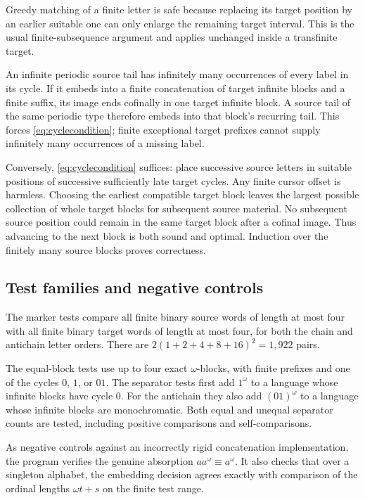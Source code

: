 \documentclass[11pt,letterpaper]{article}
\theoremstyle{definition}
\theoremstyle{remark}
\begin{document}
Greedy matching of a finite letter is safe because replacing its target
position by an earlier suitable one can only enlarge the remaining
target interval. This is the usual finite-subsequence argument and
applies unchanged inside a transfinite target.

An infinite periodic source tail has infinitely many occurrences of
every label in its cycle. If it embeds into a finite concatenation of
target infinite blocks and a finite suffix, its image ends cofinally
in one target infinite block. A source tail of the same periodic type
therefore embeds into that block's recurring tail. This forces
\eqref{eq:cyclecondition}; finite exceptional target prefixes cannot
supply infinitely many occurrences of a missing label.

Conversely, \eqref{eq:cyclecondition} suffices: place successive source
letters in suitable positions of successive sufficiently late target
cycles. Any finite cursor offset is harmless. Choosing the earliest
compatible target block leaves the largest possible collection of
whole target blocks for subsequent source material. No subsequent
source position could remain in the same target block after a cofinal
image. Thus advancing to the next block is both sound and optimal.
Induction over the finitely many source blocks proves correctness.

\subsection{Test families and negative controls}

The marker tests compare all finite binary source words of length at
most four with all finite binary target words of length at most four,
for both the chain and antichain letter orders. There are
$2(1+2+4+8+16)^2=1{,}922$ pairs.

The equal-block tests use up to four exact $\omega$-blocks, with finite
prefixes and one of the cycles $0$, $1$, or $01$. The separator tests
first add $1^\omega$ to a language whose infinite blocks have cycle $0$.
For the antichain they also add $(01)^\omega$ to a language whose infinite
blocks are monochromatic. Both equal and unequal separator counts are
tested, including positive comparisons and self-comparisons.

As negative controls against an incorrectly rigid concatenation
implementation, the program verifies the genuine absorption
$a a^\omega\equiv a^\omega$. It also checks that over a singleton
alphabet, the embedding decision agrees exactly with comparison of the
ordinal lengths $\omega t+s$ on the finite test range.
\end{document}
